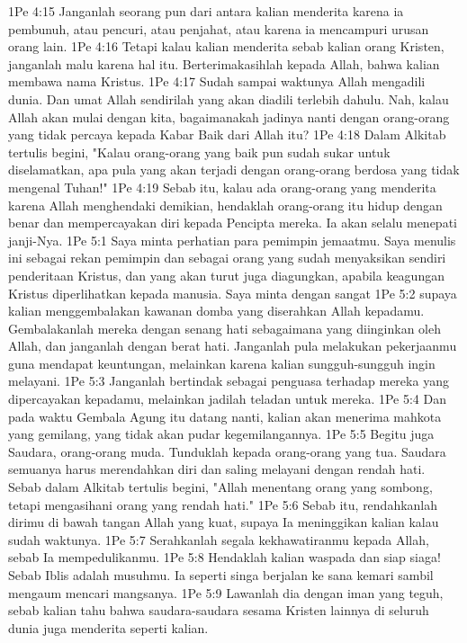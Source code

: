 1Pe 4:15  Janganlah seorang pun dari antara kalian menderita karena ia pembunuh, atau pencuri, atau penjahat, atau karena ia mencampuri urusan orang lain.
1Pe 4:16  Tetapi kalau kalian menderita sebab kalian orang Kristen, janganlah malu karena hal itu. Berterimakasihlah kepada Allah, bahwa kalian membawa nama Kristus.
1Pe 4:17  Sudah sampai waktunya Allah mengadili dunia. Dan umat Allah sendirilah yang akan diadili terlebih dahulu. Nah, kalau Allah akan mulai dengan kita, bagaimanakah jadinya nanti dengan orang-orang yang tidak percaya kepada Kabar Baik dari Allah itu?
1Pe 4:18  Dalam Alkitab tertulis begini, "Kalau orang-orang yang baik pun sudah sukar untuk diselamatkan, apa pula yang akan terjadi dengan orang-orang berdosa yang tidak mengenal Tuhan!"
1Pe 4:19  Sebab itu, kalau ada orang-orang yang menderita karena Allah menghendaki demikian, hendaklah orang-orang itu hidup dengan benar dan mempercayakan diri kepada Pencipta mereka. Ia akan selalu menepati janji-Nya.
1Pe 5:1  Saya minta perhatian para pemimpin jemaatmu. Saya menulis ini sebagai rekan pemimpin dan sebagai orang yang sudah menyaksikan sendiri penderitaan Kristus, dan yang akan turut juga diagungkan, apabila keagungan Kristus diperlihatkan kepada manusia. Saya minta dengan sangat
1Pe 5:2  supaya kalian menggembalakan kawanan domba yang diserahkan Allah kepadamu. Gembalakanlah mereka dengan senang hati sebagaimana yang diinginkan oleh Allah, dan janganlah dengan berat hati. Janganlah pula melakukan pekerjaanmu guna mendapat keuntungan, melainkan karena kalian sungguh-sungguh ingin melayani.
1Pe 5:3  Janganlah bertindak sebagai penguasa terhadap mereka yang dipercayakan kepadamu, melainkan jadilah teladan untuk mereka.
1Pe 5:4  Dan pada waktu Gembala Agung itu datang nanti, kalian akan menerima mahkota yang gemilang, yang tidak akan pudar kegemilangannya.
1Pe 5:5  Begitu juga Saudara, orang-orang muda. Tunduklah kepada orang-orang yang tua. Saudara semuanya harus merendahkan diri dan saling melayani dengan rendah hati. Sebab dalam Alkitab tertulis begini, "Allah menentang orang yang sombong, tetapi mengasihani orang yang rendah hati."
1Pe 5:6  Sebab itu, rendahkanlah dirimu di bawah tangan Allah yang kuat, supaya Ia meninggikan kalian kalau sudah waktunya.
1Pe 5:7  Serahkanlah segala kekhawatiranmu kepada Allah, sebab Ia mempedulikanmu.
1Pe 5:8  Hendaklah kalian waspada dan siap siaga! Sebab Iblis adalah musuhmu. Ia seperti singa berjalan ke sana kemari sambil mengaum mencari mangsanya.
1Pe 5:9  Lawanlah dia dengan iman yang teguh, sebab kalian tahu bahwa saudara-saudara sesama Kristen lainnya di seluruh dunia juga menderita seperti kalian.
